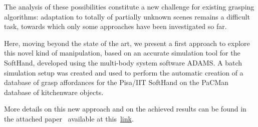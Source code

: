 The analysis of these possibilities constitute a new challenge for existing grasping algorithms: adaptation to totally of partially unknown scenes remains a difficult task, towards which only some approaches have been investigated so far.

Here, moving beyond the state of the art, we present a first approach to explore this novel kind of manipulation, based on an accurate simulation tool for the SoftHand, developed using the multi-body system software ADAMS. A batch simulation setup was created and used to perform the automatic creation of a database of grasp affordances for the Pisa/IIT SoftHand on the PaCMan database of kitchenware objects.

More details on this new approach and on the achieved results can be found in the attached paper~\cite{Bonilla:Humanoids:2015} available at this~\href{./attachedPapers/GraspingWithSoftHands.pdf}{link}. 